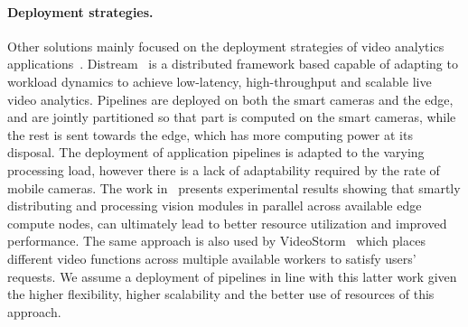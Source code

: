 \paragraph{Deployment strategies.} 
Other solutions mainly focused on the deployment strategies of video analytics applications~\cite{zeng2020distream,201465videostorm,10.1145/3477083.3480153}. Distream~\cite{zeng2020distream} is a distributed framework based capable of adapting to workload dynamics to achieve low-latency, high-throughput and scalable live video analytics. Pipelines are deployed on both the smart cameras and the edge, and are jointly partitioned so that part is computed on the smart cameras, while the rest is sent towards the edge, which has more computing power at its disposal. The deployment of application pipelines is adapted to the varying processing load, however there is a lack of adaptability required by the rate of mobile cameras.
The work in~\cite{10.1145/3477083.3480153} presents experimental results showing that smartly distributing and processing vision modules in parallel across available edge compute nodes, can ultimately lead to better resource utilization and improved performance. The same approach is also used by VideoStorm~\cite{201465videostorm} which places different video functions across multiple available workers to satisfy users' requests. We assume a deployment of pipelines in line with this latter work given the higher flexibility, higher scalability and the better use of resources of this approach. 

